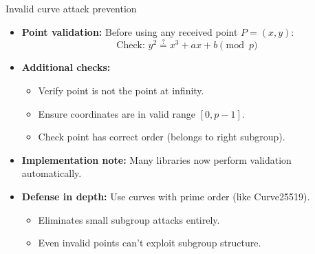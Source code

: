 \documentclass[aspectratio=169, lualatex, handout]{beamer}
\begin{document}
\begin{frame}{Invalid curve attack prevention}
	\begin{itemize}[<+->]
		\item \textbf{Point validation:} Before using any received point $P = (x, y)$:
		      $$\text{Check: } y^2 \stackrel{?}{=} x^3 + ax + b \pmod{p}$$
		\item \textbf{Additional checks:}
		      \begin{itemize}
			      \item Verify point is not the point at infinity.
			      \item Ensure coordinates are in valid range $[0, p-1]$.
			      \item Check point has correct order (belongs to right subgroup).
		      \end{itemize}
		\item \textbf{Implementation note:} Many libraries now perform validation automatically.
		\item \textbf{Defense in depth:} Use curves with prime order (like Curve25519).
		      \begin{itemize}
			      \item Eliminates small subgroup attacks entirely.
			      \item Even invalid points can't exploit subgroup structure.
		      \end{itemize}
	\end{itemize}
\end{frame}
\end{document}
